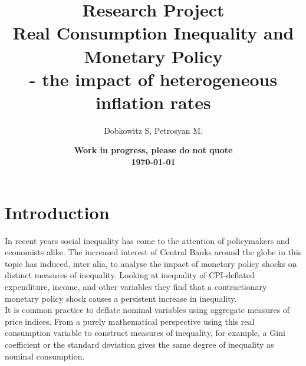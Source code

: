 \documentclass{article}
\title{Research Project\\ Real Consumption Inequality and Monetary Policy \\ - the impact of heterogeneous inflation rates}
\author{Dobkowitz S, Petrosyan M.}
\date{\bf Work in progress, please do not quote\\ \today}
\begin{document}
\maketitle

\thispagestyle{empty}
\tableofcontents
\newpage

\section{Introduction}
In recent years social inequality has come to the attention of policymakers and economists alike. The increased interest of Central Banks around the globe in this topic has induced, inter alia, \cite{Coibion2017InnocentInequality}  to analyse the impact of monetary policy shocks on distinct measures of inequality. Looking at inequality of CPI-deflated expenditure, income, and other variables they find that a contractionary monetary policy shock causes a persistent increase in inequality. \\
It is common practice to deflate nominal variables using aggregate measures of price indices. 
From a purely mathematical perspective using this real consumption variable to construct measures of inequality, for example, a Gini coefficient or the standard deviation gives the same degree of inequality as nominal consumption. \\
\end{document}
